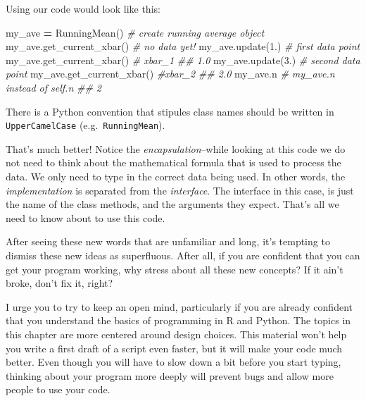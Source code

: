 \documentclass[
  12pt,
  krantz2]{krantz}
\makeatletter
\newenvironment{Shaded}{\begin{snugshade}}{\end{snugshade}}
\newcommand{\CommentTok}[1]{\textcolor[rgb]{0.37,0.37,0.37}{\textit{#1}}}
\newcommand{\FloatTok}[1]{\textcolor[rgb]{0.06,0.06,0.06}{#1}}
\newcommand{\NormalTok}[1]{#1}
\newcommand{\OperatorTok}[1]{\textcolor[rgb]{0.43,0.43,0.43}{\textbf{#1}}}
\newenvironment{kframe}{%
\medskip{}
\setlength{\fboxsep}{.8em}
 \def\at@end@of@kframe{}%
 \ifinner\ifhmode%
  \def\at@end@of@kframe{\end{minipage}}%
  \begin{minipage}{\columnwidth}%
 \fi\fi%
 \def\FrameCommand##1{\hskip\@totalleftmargin \hskip-\fboxsep
 \colorbox{shadecolor}{##1}\hskip-\fboxsep
     \hskip-\linewidth \hskip-\@totalleftmargin \hskip\columnwidth}%
 \MakeFramed {\advance\hsize-\width
   \@totalleftmargin\z@ \linewidth\hsize
   \@setminipage}}%
 {\par\unskip\endMakeFramed%
 \at@end@of@kframe}
\renewenvironment{Shaded}{\begin{kframe}}{\end{kframe}}
\makeatother
\begin{document}
Using our code would look like this:

\begin{Shaded}
\begin{Highlighting}[]
\NormalTok{my\_ave }\OperatorTok{=}\NormalTok{ RunningMean() }\CommentTok{\# create running average object}
\NormalTok{my\_ave.get\_current\_xbar() }\CommentTok{\# no data yet!}
\NormalTok{my\_ave.update(}\FloatTok{1.}\NormalTok{) }\CommentTok{\# first data point}
\NormalTok{my\_ave.get\_current\_xbar() }\CommentTok{\# xbar\_1}
\CommentTok{\#\# 1.0}
\NormalTok{my\_ave.update(}\FloatTok{3.}\NormalTok{)  }\CommentTok{\# second data point}
\NormalTok{my\_ave.get\_current\_xbar()  }\CommentTok{\#xbar\_2}
\CommentTok{\#\# 2.0}
\NormalTok{my\_ave.n   }\CommentTok{\# my\_ave.n instead of self.n}
\CommentTok{\#\# 2}
\end{Highlighting}
\end{Shaded}

\begin{rmd-details}
There is a Python convention that stipules class names should be written in \texttt{UpperCamelCase} (e.g.~\texttt{RunningMean}).

\end{rmd-details}

That's much better! Notice the \emph{encapsulation}--while looking at this code we do not need to think about the mathematical formula that is used to process the data. We only need to type in the correct data being used. In other words, the \emph{implementation} is separated from the \emph{interface}. The interface in this case, is just the name of the class methods, and the arguments they expect. That's all we need to know about to use this code.

\begin{rmd-caution}
After seeing these new words that are unfamiliar and long, it's tempting to dismiss these new ideas as superfluous. After all, if you are confident that you can get your program working, why stress about all these new concepts? If it ain't broke, don't fix it, right?

I urge you to try to keep an open mind, particularly if you are already confident that you understand the basics of programming in R and Python. The topics in this chapter are more centered around design choices. This material won't help you write a first draft of a script even faster, but it will make your code much better. Even though you will have to slow down a bit before you start typing, thinking about your program more deeply will prevent bugs and allow more people to use your code.

\end{rmd-caution}
\end{document}
